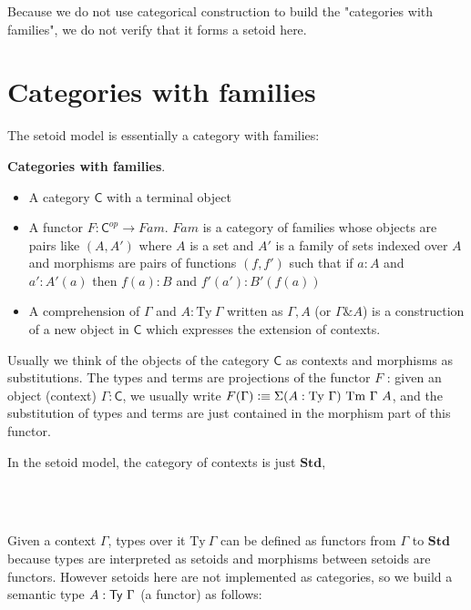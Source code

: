 Because we do not use categorical construction to build the "categories with families", we do not verify that it forms a setoid here. 

\section{Categories with families}

The setoid model is essentially a category with families:

\begin{definition}\label{cwf:def}
\textbf{Categories with families}.

\begin{itemize}
\item A category $\mathsf{C}$ with a terminal object

\item A functor $F : \mathsf{C}^{op} \to Fam$. $Fam$ is a category of families whose objects are pairs like $(A,A')$ where $A$ is a set and $A'$ is a family of sets indexed over $A$ and morphisms are pairs of functions $(f,f')$ such that if $a : A$ and $a' : A'(a)$ then $f(a) : B$ and $f'(a') : B'(f(a))$

\item A comprehension of $\Gamma$ and $A : \text{Ty}~ \Gamma$ written as $\Gamma, A$ (or  $\Gamma \& A$) is a construction of a new object in $\mathsf{C}$ which expresses the extension of contexts.
\end{itemize}

\end{definition}

Usually we think of the objects of the category $\mathsf{C}$ as contexts and morphisms as substitutions. The types and terms are projections of the functor $F$ : given an object (context) $\Gamma : \mathsf{C}$, we usually write $F(\Gamma) \vcentcolon\equiv \Sigma(A : \text{Ty} ~\Gamma) ~ \text{Tm} ~\Gamma ~ A$, and the substitution of types and terms are just contained in the morphism part of this functor. 


In the setoid model, the category of contexts is just $\textbf{Std}$,

\begin{code}
%
\\
\> \AgdaSymbol{=} \<%
\\
\end{code}

Given a context $\Gamma$, types over it $\text{Ty}~ \Gamma$ can be defined as functors from $\Gamma$ to $\textbf{Std}$ because types are interpreted as setoids and morphisms between setoids are functors. However setoids here are not implemented as categories, so we build a semantic type $A : \mathsf{Ty} ~\Gamma$ (a functor) as follows:

